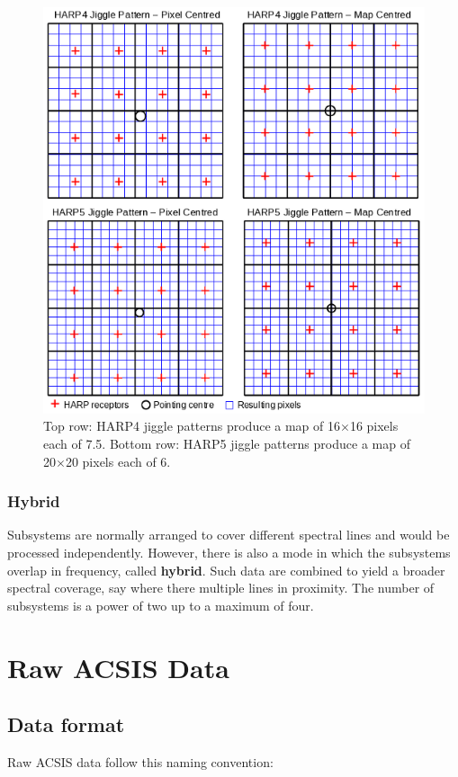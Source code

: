 \documentclass[11pt,oneside,chapters]{starlink}
\newcommand{\uarcs}{\hspace{-0.27em}\arcsec\hspace{-0.07em}}
\newcommand{\uarcs}{$''$}
\begin{document}
\begin{figure}[b!]
\begin{center}
\includegraphics[width=0.8\linewidth]{sc20_jiggles}
\caption[HARP4 and HARP5 jiggle patterns]{\label{fig:jiggle}
  Top row: HARP4 jiggle patterns produce a map of 16$\times$16 pixels
  each of 7.\uarcs5. Bottom row: HARP5 jiggle patterns produce a map of
  20$\times$20 pixels each of 6\arcsec. }
\end{center}
\end{figure}

\subsection{Hybrid}
\label{sec:hybrid}

Subsystems are normally arranged to cover different spectral lines and
would be processed independently.  However, there is also a mode in
which the subsystems overlap in frequency, called \textbf{hybrid}.
Such data are combined to yield a broader spectral coverage, say where
there multiple lines in proximity.  The number of subsystems is a
power of two up to a maximum of four.

\clearpage
\chapter{Raw ACSIS Data}
\label{sec:raw}

\section{Data format}
Raw ACSIS data follow this naming convention:
\end{document}
